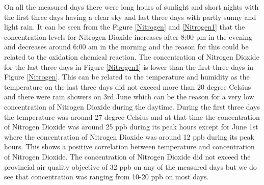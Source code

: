 On all the measured days there were long hours of sunlight and short nights with the first three days having a clear sky and last three days with partly sunny and light rain. It can be seen from the Figure \ref{Nitrogen} and \ref{Nitrogen1} that the concentration levels for Nitrogen Dioxide increases after 8:00 pm in the evening and decreases around 6:00 am in the morning and the reason for this could be related to the oxidation chemical reaction. The concentration of Nitrogen Dioxide for the last three days in Figure \ref{Nitrogen1} is lower than the first three days in Figure  \ref{Nitrogen}. This can be related to the temperature and humidity as the temperature on the last three days did not exceed more than 20 degree Celsius and there were rain showers on 3rd June which can be the reason for a very low concentration of Nitrogen Dioxide during the daytime. During the first three days the temperature was around 27 degree Celsius and at that time the concentration of Nitrogen Dioxide was around 25 ppb during its peak hours except for June 1st where the concentration of Nitrogen Dioxide was around 12 ppb during its peak hours. This shows a positive correlation between temperature and concentration of    Nitrogen Dioxide. The concentration of Nitrogen Dioxide did not exceed the provincial air quality objective of 32 ppb on any of the measured days but we do see that concentration  was ranging from 10-20 ppb on most days.

